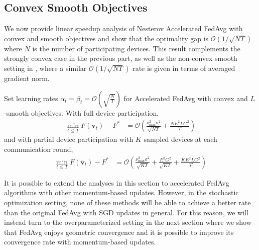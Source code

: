 \subsection{Convex Smooth Objectives}

We now provide linear speedup analysis of Nesterov Accelerated FedAvg
with convex and smooth objectives and show that the optimality gap
is $\mathcal{O}(1/\sqrt{NT})$ where $N$ is the number of participating
devices. This result complements the strongly convex case in the previous
part, as well as the non-convex smooth setting in \cite{huo2020faster,yu2019linear,li2018federated},
where a similar $\mathcal{O}(1/\sqrt{NT})$ rate is given in terms
of averaged gradient norm. 
\begin{theorem}
	\label{thm:Nesterov_cvx}Set learning rates $\alpha_{t}=\beta_{t}=\mathcal{O}(\sqrt{\frac{N}{T}})$
	for Accelerated FedAvg with convex and $L$-smooth objectives. With
	full device participation, 
	\begin{align*}
	\min_{t\leq T}F(\overline{\mathbf{v}}_{t})-F^{\ast} & =\mathcal{O}(\frac{\nu_{\max}^{2}\sigma^{2}}{\sqrt{NT}}+\frac{NE^{2}LG^{2}}{T})
	\end{align*}
	and with partial device participation with $K$ sampled devices at
	each communication round, 
	\begin{align*}
	\min_{t\leq T}F(\overline{\mathbf{v}}_{t})-F^{\ast} & =\mathcal{O}(\frac{\nu_{\max}^{2}\sigma^{2}}{\sqrt{KT}}+\frac{E^{2}G^{2}}{\sqrt{KT}}+\frac{KE^{2}LG^{2}}{T})
	\end{align*}
\end{theorem}
%
	It is possible to extend the analyses in this section to accelerated
    FedAvg algorithms with other momentum-based updates. However, in the
    stochastic optimization setting, none of these methods will be able
    to achieve a better rate than the original FedAvg with SGD updates in general.
    For this reason, we will instead turn to the overparameterized setting
    \cite{ma2017power,liu2018accelerating,canziani2016analysis} in the
    next section where we show that FedAvg enjoys geometric convergence
    and it is possible to improve its convergence rate with momentum-based updates.
